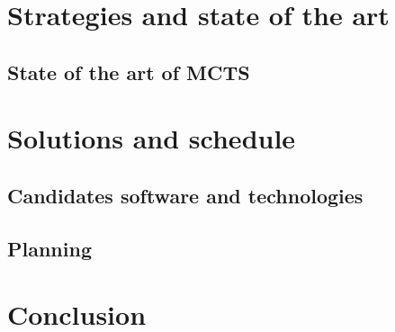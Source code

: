 \documentclass[12pt]{article}
\begin{document}
\section{Strategies and state of the art}

\subsection{State of the art of MCTS}

\section{Solutions and schedule}
\subsection{Candidates software and technologies}
\subsection {Planning} 

\section{Conclusion}



\end{document}
